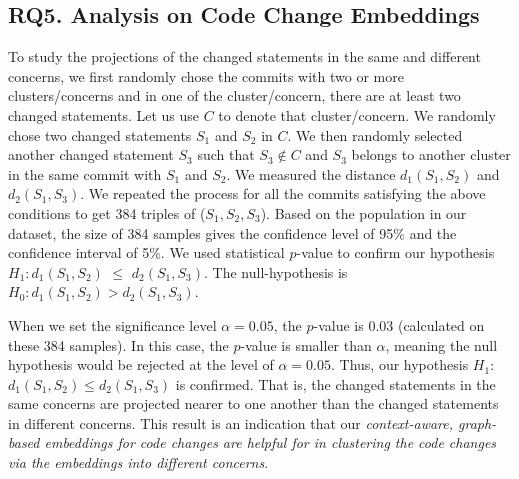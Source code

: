 \subsection{{\bf RQ5. Analysis on Code Change Embeddings}}

To study the projections of the changed statements in the same and
different concerns, we first randomly chose the commits with two or
more clusters/concerns and in one of the cluster/concern, there are at
least two changed statements. Let us use $C$ to denote that
cluster/concern. We randomly chose two changed statements $S_1$ and
$S_2$ in $C$. We then randomly selected another changed statement
$S_3$ such that $S_3 \notin C$ and $S_3$ belongs to another cluster in
the same commit with $S_1$ and $S_2$. We measured the distance
$d_1(S_1,S_2)$ and $d_2(S_1,S_3)$. We repeated the process for all the
commits satisfying the above conditions to get 384 triples of
($S_1, S_2, S_3$). Based on the population in our dataset, the size of
384 samples gives the confidence level of 95\% and the confidence
interval of 5\%.
%
We used statistical $p$-value to confirm our hypothesis
$H_1: d_1(S_1,S_2)$ $\leq$ $d_2(S_1,S_3)$. The null-hypothesis is
\textit{\textbf{$H_0: d_1(S_1,S_2) > d_2(S_1,S_3)$}}.

When we set the significance level $\alpha = 0.05$, the $p$-value is
$0.03$ (calculated on these 384 samples). In this case, the $p$-value
is smaller than $\alpha$, meaning the null hypothesis would be
rejected at the level of $\alpha = 0.05$. Thus, our hypothesis
$H_1$: $d_1(S_1,S_2)$$ \leq$$ d_2(S_1,S_3)$ is confirmed.  That is,
the changed statements in the same concerns are projected nearer to
one another than the changed statements in different concerns. This
result is an indication that our {\em context-aware, graph-based
  embeddings for code changes are helpful for {\tool} in clustering the code
  changes via the embeddings into different concerns}.






